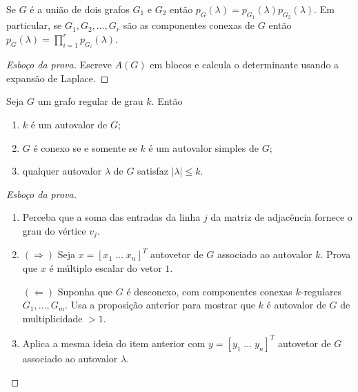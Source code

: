 \documentclass{beamer}
\begin{document}
\begin{frame}
    \begin{prop} \label{prop:polinomio_uniao}
        Se \(G\) é a união de dois grafos \(G_1\) e \(G_2\) então \(p_G(\lambda) = p_{G_1}(\lambda) p_{G_2}(\lambda)\). Em particular, se \(G_1, G_2, \ldots, G_r\) são as componentes conexas de \(G\) então \(\displaystyle p_G(\lambda) = \prod_{i=1}^r p_{G_i}(\lambda)\).
    \end{prop}
    \begin{proof}[Esboço da prova]
        Escreve \(A(G)\) em blocos e calcula o determinante usando a expansão de Laplace.
    \end{proof}
\end{frame}

\begin{frame}[allowframebreaks]
    \begin{prop}
        Seja \(G\) um grafo regular de grau \(k\). Então
        \begin{enumerate}
            \item [a.] \(k\) é um autovalor de \(G\);
            \item [b.] \(G\) é conexo se e somente se \(k\) é um autovalor simples de \(G\);
            \item [c.] qualquer autovalor \(\lambda\) de \(G\) satisfaz \(|\lambda| \leq k\).
        \end{enumerate}
    \end{prop}
    \begin{proof}[Esboço da prova]
        \begin{enumerate}
            \item [a.] Perceba que a soma das entradas da linha \(j\) da matriz de adjacência fornece o grau do vértice \(v_j\).
            \item [b.] \((\Rightarrow)\) Seja \(x = [x_1 \; \ldots \; x_n]^T\) autovetor de \(G\) associado ao autovalor \(k\). Prova que \(x\) é múltiplo escalar do vetor \(1\).
    
            \((\Leftarrow)\) Suponha que \(G\) é desconexo, com componentes conexas \(k\)-regulares \(G_1, \ldots, G_m\). Usa a proposição anterior para mostrar que \(k\) é autovalor de \(G\) de multiplicidade \(>1\).
            \item [c.] Aplica a mesma ideia do item anterior com \(y = [y_1 \; \ldots \; y_n]^T\) autovetor de \(G\) associado ao autovalor \(\lambda\).
        \end{enumerate}
    \end{proof}
\end{frame}
\end{document}
